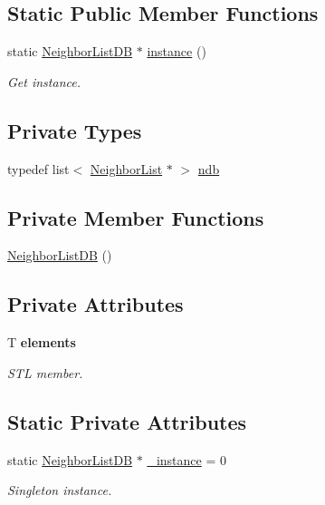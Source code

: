 \subsection*{Static Public Member Functions}
\begin{DoxyCompactItemize}
\item 
static \hyperlink{classNeighborListDB}{Neighbor\+List\+D\+B} $\ast$ \hyperlink{classNeighborListDB_a1009e4ce12cc4c5047cd0408a045a813}{instance} ()
\begin{DoxyCompactList}\small\item\em Get instance. \end{DoxyCompactList}\end{DoxyCompactItemize}
\subsection*{Private Types}
\begin{DoxyCompactItemize}
\item 
typedef list$<$ \hyperlink{classNeighborList}{Neighbor\+List} $\ast$ $>$ \hyperlink{classNeighborListDB_a56451d8a1f6d124899ce2f1013fd20ee}{ndb}
\end{DoxyCompactItemize}
\subsection*{Private Member Functions}
\begin{DoxyCompactItemize}
\item 
\hyperlink{classNeighborListDB_aeb307476e4de89f53058771fc31d7af2}{Neighbor\+List\+D\+B} ()
\end{DoxyCompactItemize}
\subsection*{Private Attributes}
\begin{DoxyCompactItemize}
\item 
T {\bfseries elements}
\begin{DoxyCompactList}\small\item\em S\+T\+L member. \end{DoxyCompactList}\end{DoxyCompactItemize}
\subsection*{Static Private Attributes}
\begin{DoxyCompactItemize}
\item 
static \hyperlink{classNeighborListDB}{Neighbor\+List\+D\+B} $\ast$ \hyperlink{classNeighborListDB_adb0e2dff13272e00d98a1028908065c6}{\+\_\+instance} = 0
\begin{DoxyCompactList}\small\item\em Singleton instance. \end{DoxyCompactList}\end{DoxyCompactItemize}


